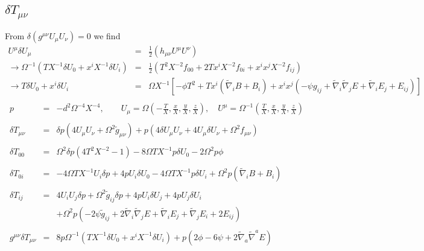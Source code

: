 \documentclass[10pt,letterpaper]{article}
\numberwithin{equation}{section}
\begin{document}
\subsection{$\delta T_{\mu\nu}$}
From $\delta(g^{\mu\nu}U_\mu U_\nu)=0$ we find
\begin{eqnarray}
U^\mu \delta U_\mu &=& \frac12 \left( h_{\mu\nu} U^\mu U^\nu\right)
\nonumber\\
\to \Omega^{-1}\left( T X^{-1}\delta U_0 + x^i X^{-1}\delta U_i\right) &=&
\frac12 \left( T^2 X^{-2} f_{00} + 2 Tx^i X^{-2} f_{0i} + x^ix^j X^{-2} f_{ij} \right)
\nonumber\\
\to T\delta U_0 + x^i \delta U_i &=& \Omega X^{-1}\left[ -\phi T^2 + Tx^i(\tilde\nabla_i B + B_i)+
x^i x^j(-\psi g_{ij} + \tilde\nabla_i \tilde\nabla_j E + \tilde\nabla_i E_j + E_{ij})\right]
\nonumber
\\
\phantom{}
\end{eqnarray}
%
\begin{eqnarray}
p &=& -d^2 \Omega^{-4} X^{-4},\qquad U_\mu =\Omega \left(-\frac{T}{X},\frac{x}{X},\frac{y}{X},\frac{z}{X}\right) ,\quad 
U^\mu = \Omega^{-1} \left(\frac{T}{X},\frac{x}{X},\frac{y}{X},\frac{z}{X}\right) 
\\ \nonumber\\
 \delta T_{\mu\nu} &=& \delta p(4 U_\mu U_\nu + \Omega^2\tilde g_{\mu\nu})+ p\left(
4 \delta U_\mu U_\nu + 4U_\mu \delta U_\nu + \Omega^2 f_{\mu\nu}\right)
\\ \nonumber\\
 \delta T_{00} &=& \Omega^2 \delta p (4T^2X^{-2} -1) -8\Omega T X^{-1} p \delta U_0 - 2\Omega^2 p \phi
\\ \nonumber\\
 \delta T_{0i} &=& -4\Omega T X^{-1} U_i \delta p + 4p U_i \delta U_0 - 4\Omega T X^{-1}  p \delta U_i
 +\Omega^2 p (\tilde\nabla_i B+B_i)
\\ \nonumber\\
 \delta T_{ij} &=& 4 U_i U_j \delta p + \Omega^2 \tilde g_{ij} \delta p + 4p U_i \delta U_j + 4p U_j \delta U_i
 \nonumber\\
 &&+ \Omega^2 p (-2\psi\tilde g_{ij} + 2\tilde\nabla_i\tilde\nabla_j E + \tilde\nabla_i E_j + \tilde\nabla_j E_i + 2E_{ij})
\\ \nonumber\\
g^{\mu\nu}\delta T_{\mu\nu} &=& 8p \Omega^{-1}\left( T X^{-1}\delta U_0 + x^i X^{-1}\delta U_i\right) + p (2\phi-6\psi+2\tilde\nabla_a\tilde\nabla^a E)
\end{eqnarray}
%
%
%
%
\newpage
\end{document}
